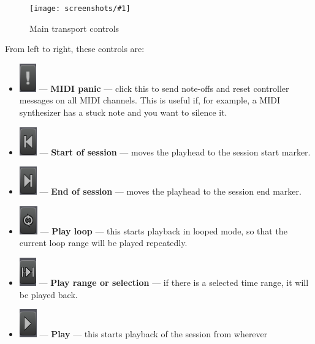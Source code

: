 \documentclass[10pt,a4paper]{book}
\newcommand{\screenshot}[3]{%
\begin{figure}[ht]%
\begin{center}
\texttt{[image: screenshots/\#1]}
\end{center}
\caption{#2}
\label{#3}
\end{figure}}
\begin{document}
\screenshot{transport-controls.png}{Main transport controls}{fig:transport-controls2}

From left to right, these controls are:
\begin{itemize}
\item \includegraphics[scale=0.5]{screenshots/midi-panic.png} ---
  \textbf{MIDI panic} --- click this to send note-offs and reset
  controller messages on all MIDI channels.  This is useful if, for
  example, a MIDI synthesizer has a stuck note and you want to silence
  it.
\item \includegraphics[scale=0.5]{screenshots/go-to-start.png} ---
  \textbf{Start of session} --- moves the playhead to the session
  start marker.
\item \includegraphics[scale=0.5]{screenshots/go-to-end.png} ---
  \textbf{End of session} --- moves the playhead to the session
  end marker.
\item \includegraphics[scale=0.5]{screenshots/loop.png} ---
  \textbf{Play loop} --- this starts playback in looped mode, so that
  the current loop range will be played repeatedly.
\item \includegraphics[scale=0.5]{screenshots/play-range.png} ---
  \textbf{Play range or selection} --- if there is a selected time
  range, it will be played back. 
\item \includegraphics[scale=0.5]{screenshots/play.png} ---
  \textbf{Play} --- this starts playback of the session from wherever

\end{itemize}
\end{document}
